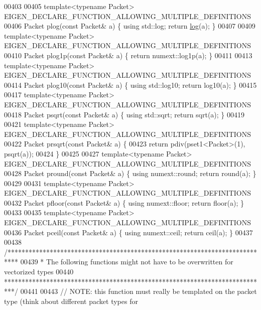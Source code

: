 \begin{DoxyCode}
{{00403 
00405 \textcolor{keyword}{template}<\textcolor{keyword}{typename} Packet> EIGEN\_DECLARE\_FUNCTION\_ALLOWING\_MULTIPLE\_DEFINITIONS
00406 Packet plog(\textcolor{keyword}{const} Packet& a) \{ \textcolor{keyword}{using} std::log; \textcolor{keywordflow}{return} \hyperlink{structlog}{log}(a); \}
00407 
00409 \textcolor{keyword}{template}<\textcolor{keyword}{typename} Packet> EIGEN\_DECLARE\_FUNCTION\_ALLOWING\_MULTIPLE\_DEFINITIONS
00410 Packet plog1p(\textcolor{keyword}{const} Packet& a) \{ \textcolor{keywordflow}{return} numext::log1p(a); \}
00411 
00413 \textcolor{keyword}{template}<\textcolor{keyword}{typename} Packet> EIGEN\_DECLARE\_FUNCTION\_ALLOWING\_MULTIPLE\_DEFINITIONS
00414 Packet plog10(\textcolor{keyword}{const} Packet& a) \{ \textcolor{keyword}{using} std::log10; \textcolor{keywordflow}{return} log10(a); \}
00415 
00417 \textcolor{keyword}{template}<\textcolor{keyword}{typename} Packet> EIGEN\_DECLARE\_FUNCTION\_ALLOWING\_MULTIPLE\_DEFINITIONS
00418 Packet psqrt(\textcolor{keyword}{const} Packet& a) \{ \textcolor{keyword}{using} std::sqrt; \textcolor{keywordflow}{return} sqrt(a); \}
00419 
00421 \textcolor{keyword}{template}<\textcolor{keyword}{typename} Packet> EIGEN\_DECLARE\_FUNCTION\_ALLOWING\_MULTIPLE\_DEFINITIONS
00422 Packet prsqrt(\textcolor{keyword}{const} Packet& a) \{
00423   \textcolor{keywordflow}{return} pdiv(pset1<Packet>(1), psqrt(a));
00424 \}
00425 
00427 \textcolor{keyword}{template}<\textcolor{keyword}{typename} Packet> EIGEN\_DECLARE\_FUNCTION\_ALLOWING\_MULTIPLE\_DEFINITIONS
00428 Packet pround(\textcolor{keyword}{const} Packet& a) \{ \textcolor{keyword}{using} numext::round; \textcolor{keywordflow}{return} round(a); \}
00429 
00431 \textcolor{keyword}{template}<\textcolor{keyword}{typename} Packet> EIGEN\_DECLARE\_FUNCTION\_ALLOWING\_MULTIPLE\_DEFINITIONS
00432 Packet pfloor(\textcolor{keyword}{const} Packet& a) \{ \textcolor{keyword}{using} numext::floor; \textcolor{keywordflow}{return} floor(a); \}
00433 
00435 \textcolor{keyword}{template}<\textcolor{keyword}{typename} Packet> EIGEN\_DECLARE\_FUNCTION\_ALLOWING\_MULTIPLE\_DEFINITIONS
00436 Packet pceil(\textcolor{keyword}{const} Packet& a) \{ \textcolor{keyword}{using} numext::ceil; \textcolor{keywordflow}{return} ceil(a); \}
00437 
00438 \textcolor{comment}{/***************************************************************************}
00439 \textcolor{comment}{* The following functions might not have to be overwritten for vectorized types}
00440 \textcolor{comment}{***************************************************************************/}
00441 
00443 \textcolor{comment}{// NOTE: this function must really be templated on the packet type (think about different packet types for
}}}
\end{DoxyCode}
